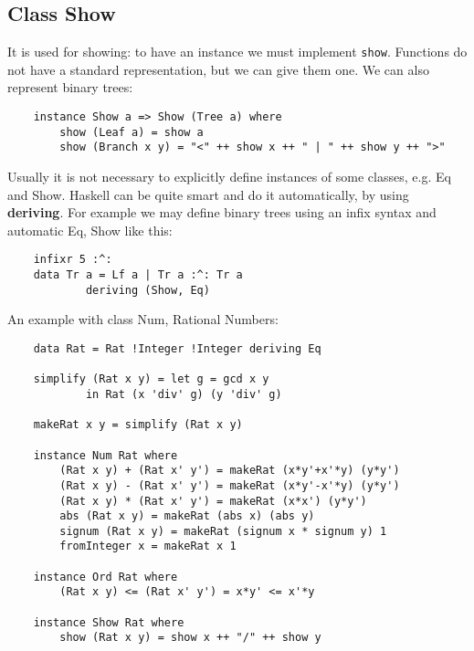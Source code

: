 \subsection{Class Show}
It is used for showing: to have an instance we must implement \texttt{show}.
Functions do not have a standard representation, but we can give them one.
We can also represent binary trees:
\begin{lstlisting}
	instance Show a => Show (Tree a) where
		show (Leaf a) = show a
		show (Branch x y) = "<" ++ show x ++ " | " ++ show y ++ ">"
\end{lstlisting}
Usually it is not necessary to explicitly define instances of some classes, e.g. Eq and Show.
Haskell can be quite smart and do it automatically, by using \textbf{deriving}.
For example we may define binary trees using an infix syntax and automatic Eq, Show like this:
\begin{lstlisting}
	infixr 5 :^:
	data Tr a = Lf a | Tr a :^: Tr a
			deriving (Show, Eq)
\end{lstlisting}
An example with class Num, Rational Numbers:
\begin{lstlisting}
	data Rat = Rat !Integer !Integer deriving Eq
	
	simplify (Rat x y) = let g = gcd x y
			in Rat (x 'div' g) (y 'div' g)
			
	makeRat x y = simplify (Rat x y)
	
	instance Num Rat where
		(Rat x y) + (Rat x' y') = makeRat (x*y'+x'*y) (y*y')
		(Rat x y) - (Rat x' y') = makeRat (x*y'-x'*y) (y*y')
		(Rat x y) * (Rat x' y') = makeRat (x*x') (y*y')
		abs (Rat x y) = makeRat (abs x) (abs y)
		signum (Rat x y) = makeRat (signum x * signum y) 1
		fromInteger x = makeRat x 1
		
	instance Ord Rat where
		(Rat x y) <= (Rat x' y') = x*y' <= x'*y
		
	instance Show Rat where
		show (Rat x y) = show x ++ "/" ++ show y
\end{lstlisting}

